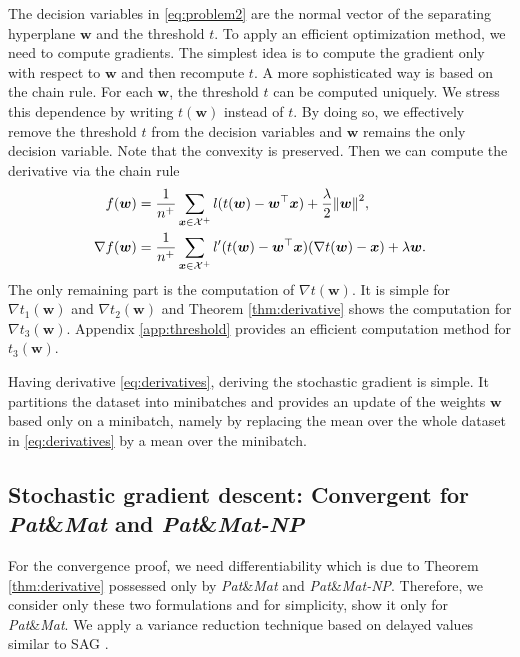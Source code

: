 \documentclass{Thesis}
\newcommand{\Brac}[2][r]{%
  \ifx r#1 \left(       #2 \right)       \else
  \ifx c#1 \left\{      #2 \right\}      \else
  \ifx s#1 \left[       #2 \right]       \else
  \ifx v#1 \left\vert   #2 \right\vert   \else
  \ifx a#1 \left\langle #2 \right\rangle \else
  \ifx t#1 \left\lceil  #2 \right\rceil  \else
  \ifx b#1 \left\lfloor #2 \right\rfloor \else
  \ifx n#1 \left\|      #2 \right\|      \else
  \mathrm{Illegal~option}%
  \fi\fi\fi\fi\fi\fi\fi\fi
}
\newcommand{\Xc}{\mathcal{X}}
\newcommand{\norm}[1]{\Brac[n]{#1}}
\newcommand{\PatMat}{\emph{Pat}\&\emph{Mat}\xspace}
\newcommand{\PatMatNP}{{\emph{Pat}\&\emph{Mat-NP}}\xspace}
\begin{document}
The decision variables in \eqref{eq:problem2} are the normal vector of the separating hyperplane $\bm{w}$ and the threshold $t$. To apply an efficient optimization method, we need to compute gradients. The simplest idea \cite{Grill_2016} is to compute the gradient only with respect to $\bm{w}$ and then recompute $t$. A more sophisticated way is based on the chain rule. For each $\bm{w}$, the threshold $t$ can be computed uniquely. We stress this dependence by writing $t(\bm{w})$ instead of $t$. By doing so, we effectively remove the threshold $t$ from the decision variables and $\bm{w}$ remains the only decision variable. Note that the convexity is preserved. Then we can compute the derivative via the chain rule
\begin{equation}\label{eq:derivatives}
  \begin{aligned}
  f(\bm{w}) & = \frac{1}{n^+}\sum_{\bm{x} \in \Xc^+} l(t(\bm{w}) - \bm{w}^\top \bm{x}) + \frac{\lambda}{2}\norm{\bm{w}}^2, \\
  \nabla f(\bm{w}) & = \frac{1}{n^+}\sum_{\bm{x} \in \Xc^+} l'(t(\bm{w}) - \bm{w}^\top \bm{x})(\nabla t(\bm{w}) - \bm{x}) + \lambda \bm{w}.
  \end{aligned}
\end{equation}
The only remaining part is the computation of $\nabla t(\bm{w})$. It is simple for $\nabla t_1(\bm{w})$ and $\nabla t_2(\bm{w})$ and Theorem \ref{thm:derivative} shows the computation for $\nabla t_3(\bm{w})$. Appendix \ref{app:threshold} provides an efficient computation method for $t_3(\bm{w})$.

Having derivative \eqref{eq:derivatives}, deriving the stochastic gradient is simple. It partitions the dataset into minibatches and provides an update of the weights $\bm{w}$ based only on a minibatch, namely by replacing the mean over the whole dataset in \eqref{eq:derivatives} by a mean over the minibatch.

\subsection{Stochastic gradient descent: Convergent for \PatMat and \PatMatNP}

For the convergence proof, we need differentiability which is due to Theorem \ref{thm:derivative} possessed only by \PatMat and \PatMatNP. Therefore, we consider only these two formulations and for simplicity, show it only for \PatMat. We apply a variance reduction technique based on delayed values similar to SAG \cite{schmidt2017minimizing}. 
\end{document}
